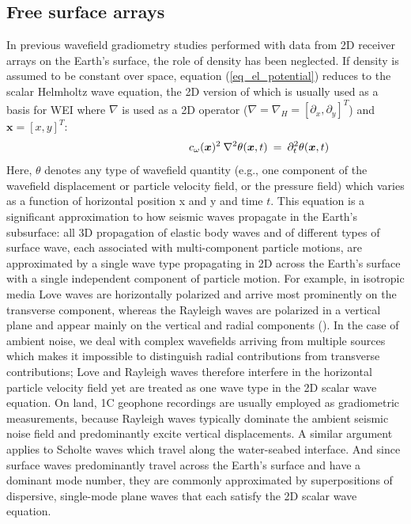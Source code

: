 \documentclass{article}
\begin{document}
	\subsection{Free surface arrays}\label{methS}
	In previous wavefield gradiometry studies performed with data from 2D receiver arrays on the Earth's surface, the role of density has been neglected. If density is assumed to be constant over space, equation (\ref{eq_el_potential}) reduces to the scalar Helmholtz wave equation, the 2D version of which is usually used as a basis for WEI where $\nabla$ is used as a 2D operator ($\nabla = \nabla_{H} = [\partial_{x}, \partial_{y}]^{T}$) and $\bm{x} = [x,y]^{T}$:
	\begin{align}\label{eq:helm}
		\shoveright \shoveright \shoveright \shoveright \shoveright \shoveright \shoveright \shoveright \shoveright \shoveright%
		\: \; \; c_{\omega}(\bm{x})^{2} \: \nabla^{2} \theta(\bm{x},t) &\: = \: \partial_{t}^{2}\theta(\bm{x},t)
	\end{align}
	Here, $\theta$ denotes any type of wavefield quantity (e.g., one component of the wavefield displacement or particle velocity field, or the pressure field) which varies as a function of horizontal position x and y and time $t$. This equation is a significant approximation to how seismic waves propagate in the Earth's subsurface: all 3D propagation of elastic body waves and of different types of surface wave, each associated with multi-component particle motions, are approximated by a single wave type propagating in 2D across the Earth's surface with a single independent component of particle motion. For example, in isotropic media Love waves are horizontally polarized and arrive most prominently on the transverse component, whereas the Rayleigh waves are polarized in a vertical plane and appear mainly on the vertical and radial components (\cite{shearer2019introduction}). In the case of ambient noise, we deal with complex wavefields arriving from multiple sources which makes it impossible to distinguish radial contributions from transverse contributions; Love and Rayleigh waves therefore interfere in the horizontal particle velocity field yet are treated as one wave type in the 2D scalar wave equation. On land, 1C geophone recordings are usually employed as gradiometric measurements, because Rayleigh waves typically dominate the ambient seismic noise field and predominantly excite vertical displacements. A similar argument applies to Scholte waves which travel along the water-seabed interface. And since surface waves predominantly travel across the Earth's surface and have a dominant mode number, they are commonly approximated by superpositions of dispersive, single-mode plane waves that each satisfy the 2D scalar wave equation. \\%
	
\end{document}
